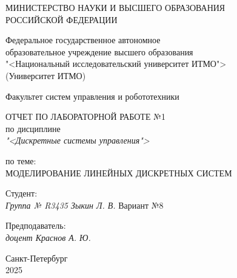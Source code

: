\thispagestyle{empty}

\begin{center}
    МИНИСТЕРСТВО НАУКИ И ВЫСШЕГО ОБРАЗОВАНИЯ \\ РОССИЙСКОЙ ФЕДЕРАЦИИ

    \vspace{20pt}

    Федеральное государственное автономное \\ образовательное учреждение высшего образования \\
    "<Национальный исследовательский университет ИТМО"> \\
    (Университет ИТМО)

    \vspace{20pt}

    Факультет систем управления и робототехники
\end{center}

\vfill

\begin{center}
    ОТЧЕТ ПО ЛАБОРАТОРНОЙ РАБОТЕ №1\\  
    по дисциплине \\
    \textit{"<Дискретные системы управления">}

    \vspace{20pt}

    по теме: \\
    \uppercase{Моделирование линейных дискретных систем}
\end{center}

\vfill

    \noindent Студент: \\
    \textit{Группа № R3435 \hfill Зыкин Л. В.}
    \noindent Вариант №8 \\
    \vspace{20pt}

    \noindent Предподаватель: \\
    \textit{доцент \hfill Краснов А. Ю.}

\vfill

\begin{center}
    Санкт-Петербург \\ 2025
\end{center}